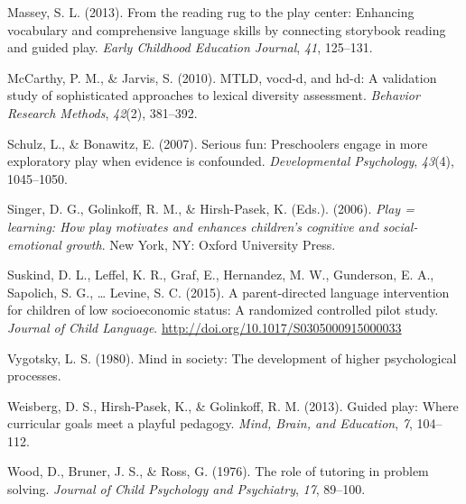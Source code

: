 \documentclass[10pt, letterpaper]{article}
\begin{document}
\hypertarget{ref-Massey2013}{}
Massey, S. L. (2013). From the reading rug to the play center: Enhancing
vocabulary and comprehensive language skills by connecting storybook
reading and guided play. \emph{Early Childhood Education Journal},
\emph{41}, 125--131.

\hypertarget{ref-McCarthy2010}{}
McCarthy, P. M., \& Jarvis, S. (2010). MTLD, vocd-d, and hd-d: A
validation study of sophisticated approaches to lexical diversity
assessment. \emph{Behavior Research Methods}, \emph{42}(2), 381--392.

\hypertarget{ref-Schulz2007}{}
Schulz, L., \& Bonawitz, E. (2007). Serious fun: Preschoolers engage in
more exploratory play when evidence is confounded. \emph{Developmental
Psychology}, \emph{43}(4), 1045--1050.

\hypertarget{ref-Singer2006}{}
Singer, D. G., Golinkoff, R. M., \& Hirsh-Pasek, K. (Eds.). (2006).
\emph{Play = learning: How play motivates and enhances children's
cognitive and social-emotional growth}. New York, NY: Oxford University
Press.

\hypertarget{ref-Suskind2015}{}
Suskind, D. L., Leffel, K. R., Graf, E., Hernandez, M. W., Gunderson, E.
A., Sapolich, S. G., \ldots{} Levine, S. C. (2015). A parent-directed
language intervention for children of low socioeconomic status: A
randomized controlled pilot study. \emph{Journal of Child Language}.
\url{http://doi.org/10.1017/S0305000915000033}

\hypertarget{ref-Vygotsky1980}{}
Vygotsky, L. S. (1980). Mind in society: The development of higher
psychological processes.

\hypertarget{ref-Weisberg2013}{}
Weisberg, D. S., Hirsh-Pasek, K., \& Golinkoff, R. M. (2013). Guided
play: Where curricular goals meet a playful pedagogy. \emph{Mind, Brain,
and Education}, \emph{7}, 104--112.

\hypertarget{ref-Wood1976}{}
Wood, D., Bruner, J. S., \& Ross, G. (1976). The role of tutoring in
problem solving. \emph{Journal of Child Psychology and Psychiatry},
\emph{17}, 89--100.


\end{document}
